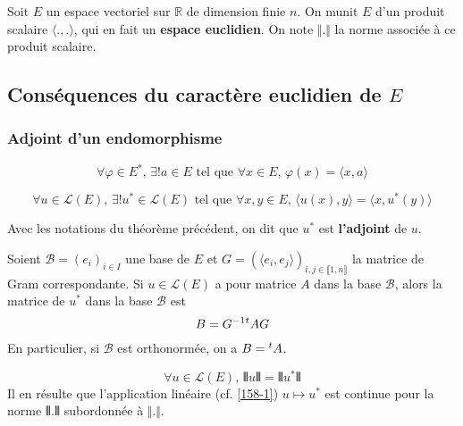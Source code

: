 




	Soit $E$ un espace vectoriel sur $\mathbb{R}$ de dimension finie $n$. On munit $E$ d'un produit scalaire $\langle . , . \rangle$, qui en fait un \textbf{espace euclidien}. On note $\Vert . \Vert$ la norme associée à ce produit scalaire.

	\subsection{Conséquences du caractère euclidien de \texorpdfstring{$E$}{E}}

	\subsubsection{Adjoint d'un endomorphisme}


	\begin{lemma}
		\[ \forall \varphi \in E^*, \, \exists! a \in E \text{ tel que } \forall x \in E, \, \varphi(x) = \langle x, a \rangle \]
	\end{lemma}

	\begin{theorem}
		\[ \forall u \in \mathcal{L}(E), \, \exists! u^* \in \mathcal{L}(E) \text{ tel que } \forall x, y \in E, \, \langle u(x), y \rangle = \langle x, u^*(y) \rangle \]
	\end{theorem}

	\begin{definition}
		Avec les notations du théorème précédent, on dit que $u^*$ est \textbf{l'adjoint} de $u$.
	\end{definition}

	\begin{theorem}
		Soient $\mathcal{B} = (e_i)_{i \in I}$ une base de $E$ et $G = (\langle e_i, e_j \rangle)_{i,j \in \llbracket 1, n \rrbracket}$ la matrice de Gram correspondante. Si $u \in \mathcal{L}(E)$ a pour matrice $A$ dans la base $\mathcal{B}$, alors la matrice de $u^*$ dans la base $\mathcal{B}$ est
		\[ B = G^{-1} \mathstrut ^t A G \]
		En particulier, si $\mathcal{B}$ est orthonormée, on a $B = \mathstrut ^t A$.
	\end{theorem}


	\begin{proposition}
		\[ \forall u \in \mathcal{L}(E), \, \VERT u \VERT = \VERT u^* \VERT \]
		Il en résulte que l'application linéaire (cf. \cref{158-1}) $u \mapsto u^*$ est continue pour la norme $\VERT . \VERT$ subordonnée à $\Vert . \Vert$.
	\end{proposition}

